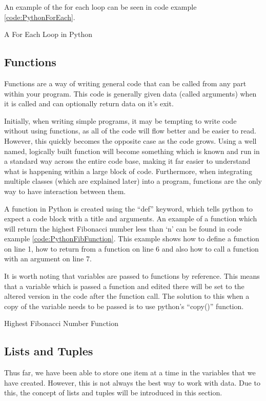 				An example of the for each loop can be seen in code example \ref{code:PythonForEach}.
				\begin{code}
					\caption{A For Each Loop in Python}
					\label{code:PythonForEach}
				\end{code}
		\subsection{Functions}
			Functions are a way of writing general code that can be called from any part within your program.
			This code is generally given data (called arguments) when it is called and can optionally return data on it's exit.

			Initially, when writing simple programs, it may be tempting to write code without using functions, as all of the code will flow better and be easier to read.
			However, this quickly becomes the opposite case as the code grows.
			Using a well named, logically built function will become something which is known and run in a standard way across the entire code base, making it far easier to understand what is happening within a large block of code.
			Furthermore, when integrating multiple classes (which are explained later) into a program, functions are the only way to have interaction between them.

			A function in Python is created using the ``def'' keyword, which tells python to expect a code block with a title and arguments.
			An example of a function which will return the highest Fibonacci number less than `n' can be found in code example \ref{code:PythonFibFunction}.
			This example shows how to define a function on line 1, how to return from a function on line 6 and also how to call a function with an argument on line 7.

			It is worth noting that variables are passed to functions by reference.
			This means that a variable which is passed a function and edited there will be set to the altered version in the code after the function call.
			The solution to this when a copy of the variable needs to be passed is to use python's ``copy()'' function.

			\begin{code}
				\pcode{./PythonFibFunction.py}
				\caption{Highest Fibonacci Number Function}
				\label{code:PythonFibFunction}
			\end{code}
		\subsection{Lists and Tuples}
			Thus far, we have been able to store one item at a time in the variables that we have created.
			However, this is not always the best way to work with data.
			Due to this, the concept of lists and tuples will be introduced in this section.
